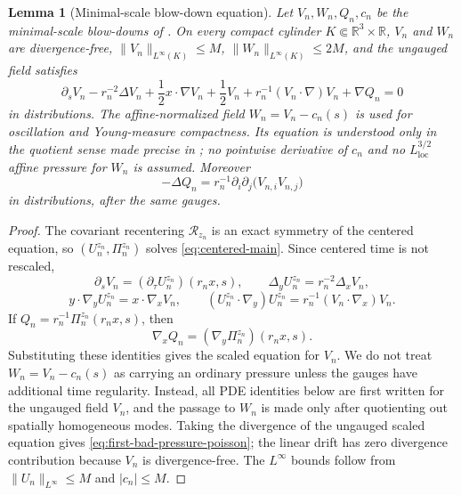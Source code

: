\documentclass[11pt]{amsart}
\numberwithin{equation}{section}
\theoremstyle{plain}
\newtheorem{lemma}[theorem]{Lemma}
\theoremstyle{definition}
\theoremstyle{remark}
\newcommand{\loc}{\mathrm{loc}}
\newcommand{\calR}{\mathcal R}
\begin{document}
\begin{lemma}[Minimal-scale blow-down equation]
\label{lem:first-bad-blowdown-equation}
Let \(V_n,W_n,Q_n,c_n\) be the minimal-scale blow-downs of
.  On every compact cylinder
\(K\Subset\mathbb R^3\times\mathbb R\), \(V_n\) and \(W_n\) are
divergence-free, \(\|V_n\|_{L^\infty(K)}\le M\),
\(\|W_n\|_{L^\infty(K)}\le2M\), and the ungauged field satisfies
\begin{equation}\label{eq:first-bad-scaled-equation}
   \partial_sV_n
   -r_n^{-2}\Delta V_n
   +\frac12x\cdot\nabla V_n+\frac12V_n
   +r_n^{-1}(V_n\cdot\nabla)V_n
   +\nabla Q_n
   =0
\end{equation}
in distributions.  The affine-normalized field \(W_n=V_n-c_n(s)\) is used for
oscillation and Young-measure compactness.  Its equation is understood only in
the quotient sense made precise in
; no pointwise derivative of \(c_n\)
and no \(L^{3/2}_{\loc}\) affine pressure for \(W_n\) is assumed.
Moreover
\begin{equation}\label{eq:first-bad-pressure-poisson}
   -\Delta Q_n
   =
   r_n^{-1}\partial_i\partial_j
   \bigl(V_{n,i}V_{n,j}\bigr)
\end{equation}
in distributions, after the same gauges.
\end{lemma}

\begin{proof}
The covariant recentering \(\calR_{z_n}\) is an exact symmetry of the centered
equation, so \((U_n^{z_n},\Pi_n^{z_n})\) solves
\eqref{eq:centered-main}.  Since centered
time is not rescaled,
\[
   \partial_sV_n=(\partial_\tau U_n^{z_n})(r_nx,s),\qquad
   \Delta_yU_n^{z_n}=r_n^{-2}\Delta_xV_n,
\]
\[
   y\cdot\nabla_yU_n^{z_n}=x\cdot\nabla_xV_n,\qquad
   (U_n^{z_n}\cdot\nabla_y)U_n^{z_n}
   =
   r_n^{-1}(V_n\cdot\nabla_x)V_n .
\]
If \(Q_n=r_n^{-1}\Pi_n^{z_n}(r_nx,s)\), then
\[
   \nabla_xQ_n=(\nabla_y\Pi_n^{z_n})(r_nx,s).
\]
Substituting these identities gives the scaled equation for \(V_n\).  We do not
treat \(W_n=V_n-c_n(s)\) as carrying an ordinary pressure unless the gauges have
additional time regularity.  Instead, all PDE identities below are first written
for the ungauged field \(V_n\), and the passage to \(W_n\) is made only after
quotienting out spatially homogeneous modes.  Taking the divergence
of the ungauged scaled equation gives
\eqref{eq:first-bad-pressure-poisson}; the linear drift has zero divergence
contribution because \(V_n\) is divergence-free.  The \(L^\infty\) bounds follow
from \(\|U_n\|_{L^\infty}\le M\) and \(|c_n|\le M\).
\end{proof}
\end{document}
